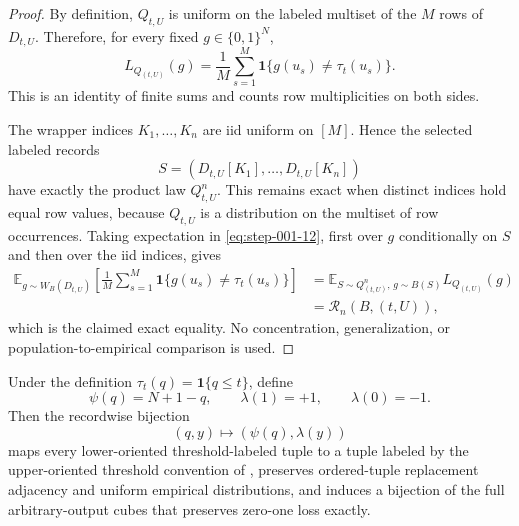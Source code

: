\begin{proof}

By definition, \(Q_{t,U}\) is uniform on the labeled multiset of the \(M\) rows of \(D_{t,U}\). Therefore, for every fixed \(g \in \{0,1\}^N\),
\[
L_{Q_{(t,U)}}(g)
=\frac1M\sum_{s=1}^M
\mathbf 1\{g(u_s)\ne\tau_t(u_s)\}.
\tag{12}\label{eq:step-001-12}
\]
This is an identity of finite sums and counts row multiplicities on both sides.

The wrapper indices \(K_1,\ldots,K_n\) are iid uniform on \([M]\). Hence the selected labeled records
\[
S=(D_{t,U}[K_1],\ldots,D_{t,U}[K_n])
\]
have exactly the product law \(Q_{t,U}^n\). This remains exact when distinct indices hold equal row values, because \(Q_{t,U}\) is a distribution on the multiset of row occurrences. Taking expectation in \eqref{eq:step-001-12}, first over \(g\) conditionally on \(S\) and then over the iid indices, gives
\[
\begin{aligned}
\mathbb E_{g\sim W_B(D_{t,U})}
\left[\frac1M\sum_{s=1}^M
\mathbf 1\{g(u_s)\ne\tau_t(u_s)\}\right]
&=\mathbb E_{S\sim Q_{(t,U)}^n,\,g\sim B(S)}
L_{Q_{(t,U)}}(g)\\
&=\mathcal R_n(B,(t,U)),
\end{aligned}
\tag{13}\label{eq:step-001-13}
\]
which is the claimed exact equality. No concentration, generalization, or population-to-empirical comparison is used.

\end{proof}


\begin{proposition}
\label{prop:step-001-orientation}

Under the definition \(\tau_t(q)=\mathbf 1\{q\le t\}\), define
\[
\psi(q)=N+1-q,
\qquad
\lambda(1)=+1,
\qquad
\lambda(0)=-1.
\tag{14}\label{eq:step-001-14}
\]
Then the recordwise bijection
\[
(q,y)\longmapsto(\psi(q),\lambda(y))
\tag{15}\label{eq:step-001-15}
\]
maps every lower-oriented threshold-labeled tuple to a tuple labeled by the upper-oriented threshold convention of \citet{alonEtAl2018private}, preserves ordered-tuple replacement adjacency and uniform empirical distributions, and induces a bijection of the full arbitrary-output cubes that preserves zero-one loss exactly.

\end{proposition}

